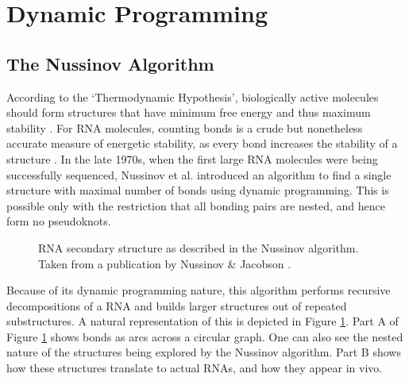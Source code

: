 \documentclass[12pt, a4paper]{article}
\begin{document}
\section{Dynamic Programming}
\subsection{The Nussinov Algorithm}
According to the `Thermodynamic Hypothesis', biologically active molecules should form structures that have minimum free energy and thus maximum stability \cite{anfinsen1973principles}. For RNA molecules, counting bonds is a crude but nonetheless accurate measure of energetic stability, as every bond increases the
stability of a structure \cite{nussinov1978algorithms}. In the late 1970s, when the first large RNA molecules
were being successfully sequenced, Nussinov et al. \cite{nussinov1978algorithms} introduced an algorithm to find a single structure with maximal number of bonds using dynamic programming. This is possible only with the restriction that all bonding pairs are nested, and hence form no pseudoknots.

\begin{figure}
\begin{center}
\end{center}
\caption{RNA secondary structure as described in the Nussinov algorithm.
Taken from a publication by Nussinov \& Jacobson \cite{nussinov1980fast}.}
\label{nuss_rna}
\end{figure}


Because of its dynamic programming nature, this algorithm performs recursive decompositions of a RNA and builds
larger structures out of repeated substructures. A natural representation of this is
depicted in Figure \ref{nuss_rna}. Part A of Figure \ref{nuss_rna} shows bonds as arcs across a circular
graph. One can also see the nested nature of the structures being explored by the
Nussinov algorithm. Part B shows how these structures translate to actual RNAs, and how they appear in vivo.
\end{document}
